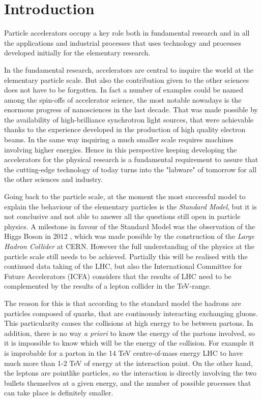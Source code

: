 \chapter{Introduction}
Particle accelerators occupy a key role both in fundamental research and in all the applications and industrial processes that uses technology and processes developed initially for the elementary research.

In the fundamental research, accelerators are central to inquire the world at the elementary particle scale. But also the contribution given to the other sciences does not have to be forgotten.
In fact a number of examples could be named among the spin-offs of accelerator science, the most notable nowadays is the enormous progress of nanosciences in the last decade. That was made possible by the availability of high-brilliance synchrotron light sources, that were achievable thanks to the experience developed in the production of high quality electron beams. In the same way inquiring a much smaller scale requires machines involving higher energies.
 Hence in this perspective keeping developing the accelerators for the physical research is a fundamental requirement to assure that the cutting-edge technology of today turns into the "labware" of tomorrow for all the other sciences and industry.

Going back to the particle scale, at the moment the most successful model to explain the behaviour of the elementary particles is the \textit{Standard Model}, but it is not conclusive and not able to answer all the questions still open in particle physics. A milestone in favour of the Standard Model was the observation of the Higgs Boson in 2012 \cite{CMS:higgs,ATLAS:higgs}, which was made possible by the construction of the \textit{Large Hadron Collider} at CERN\cite{LHC:design}. However the full understanding of the physics at the particle scale still needs to be achieved. Partially this will be realised with the continued data taking of the LHC, but also the International Committee for Future Accelerators (ICFA) considers that the results of LHC need to be complemented by the results of a lepton collider in the TeV-range\cite{ICFA:linStat}.

The reason for this is that according to the standard model the hadrons are particles composed of quarks, that are continously interacting exchanging gluons. This particularity causes the collisions at high energy to be between partons. In addition, there is no  way \textit{a priori} to know the energy of the partons involved, so it is impossible to know which will be the energy of the collision. For example it is improbable for a parton in the 14 TeV centre-of-mass energy LHC to have much more than 1-2 TeV of energy at the interaction point\cite{LHC:partonDistrib}. On the other hand, the leptons are pointlike particles, so the interaction is directly involving the two bullets themselves at a given energy, and the number of possible processes that can take place is definitely smaller. 

